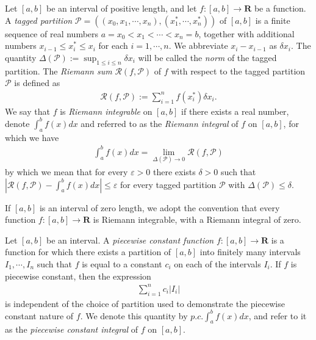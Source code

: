\documentclass{book}
\theoremstyle{defstyle}
\theoremstyle{thmstyle}
\begin{document}
\begin{definition}\label{def:riemann integrability}
    Let $[a, b]$ be an interval of positive length, and let $f : [a, b] \to \mathbf{R}$ be a function. A \emph{tagged partition} $\mathcal{P} = ((x_0, x_1, \cdots, x_n), (x^*_1, \cdots, x^*_n))$ of $[a, b]$ is a finite sequence of real numbers $a = x_0 < x_1 < \cdots < x_n = b$, together with additional numbers $x_{i - 1} \leq x^*_i \leq x_i$ for each $i = 1, \cdots, n$. We abbreviate $x_i - x_{i - 1}$ as $\delta x_i$. The quantity $\Delta(\mathcal{P}) := \sup_{1 \leq i \leq n}\delta x_i$ will be called the \emph{norm} of the tagged partition. The \emph{Riemann sum} $\mathcal{R}(f, \mathcal{P})$ of $f$ with respect to the tagged partition $\mathcal{P}$ is defined as
        \begin{align*}
            \mathcal{R}(f, \mathcal{P}) := \sum_{i = 1}^{n}f(x^*_i)\delta x_i.
        \end{align*}
    We say that $f$ is \emph{Riemann integrable} on $[a, b]$ if there exists a real number, denote $\int_{a}^{b}f(x) dx$ and referred to as the \emph{Riemann integral} of $f$ on $[a, b]$, for which we have
        \begin{align*}
            \int_{a}^{b}f(x)dx = \lim_{\Delta(\mathcal{P}) \to 0}\mathcal{R}(f, \mathcal{P})
        \end{align*}
    by which we mean that for every $\varepsilon > 0$ there exists $\delta > 0$ such that $|\mathcal{R}(f, \mathcal{P}) - \int_{a}^{b}f(x)dx| \leq \varepsilon$ for every tagged partition $\mathcal{P}$ with $\Delta(\mathcal{P}) \leq \delta$.

    If $[a, b]$ is an interval of zero length, we adopt the convention that every function $f : [a, b] \to \mathbf{R}$ is Riemann integrable, with a Riemann integral of zero.
\end{definition}

\begin{proposition}\label{thm:piecewise constant functions}
    Let $[a, b]$ be an interval. A \emph{piecewise constant function} $f : [a, b] \to \mathbf{R}$ is a function for which there exists a partition of $[a, b]$ into finitely many intervals $I_1, \cdots, I_n$ such that $f$ is equal to a constant $c_i$ on each of the intervals $I_i$. If $f$ is piecewise constant, then the expression
        \begin{align*}
            \sum_{i = 1}^{n}c_i|I_i|
        \end{align*}
    is independent of the choice of partition used to demonstrate the piecewise constant nature of $f$. We denote this quantity by $p.c.\int_{a}^{b}f(x)dx$, and refer to it as the \emph{piecewise constant integral} of $f$ on $[a, b]$.
\end{proposition}
\end{document}
